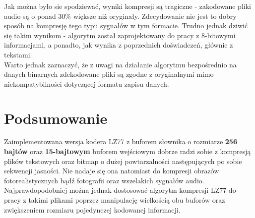 \documentclass{article}
\begin{document}
Jak można było sie spodziewać, wyniki kompresji są tragiczne - zakodowane pliki audio są o ponad 30\% większe niż oryginały. Zdecydowanie nie jest to dobry sposób na kompresję tego typu sygnałów w tym formacie. Trudno jednak dziwić się takim wynikom - algorytm został zaprojektowany do pracy z 8-bitowymi informacjami, a ponadto, jak wynika z poprzednich doświadczeń, głównie z tekstami.
\\Warto jednak zaznaczyć, że z uwagi na działanie algorytmu bezpośrednio na danych binarnych zdekodowane pliki są zgodne z oryginalnymi mimo niekompatybilności dotyczącej formatu zapisu danych.
\section{Podsumowanie}
Zaimplementowana wersja kodera LZ77 z buforem słownika o rozmiarze \textbf{256 bajtów} oraz \textbf{15-bajtowym} buforem wejściowym dobrze radzi sobie z kompresją plików tekstowych oraz bitmap o dużej powtarzalności następujących po sobie sekwencji jasności. Nie nadaje się ona natomiast do kompresji obrazów fotorealistycznych bądź fotografii oraz wszelakich sygnałów audio. Najprawdopodobniej można jednak dostosować algorytm kompresji LZ77 do pracy z takimi plikami poprzez manipulację wielkością obu buforów oraz zwiększeniem rozmiaru pojedynczej kodowanej informacji. 
\end{document}
